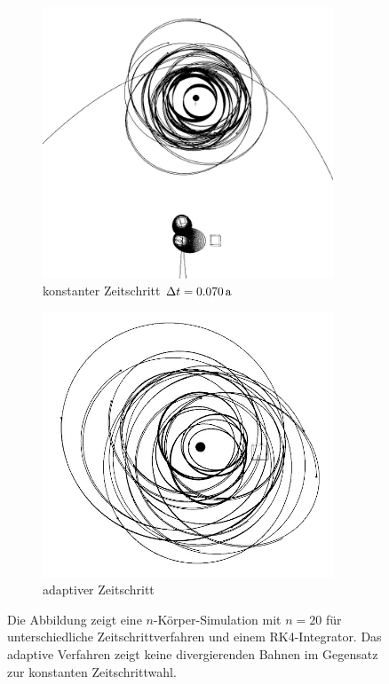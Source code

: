     \begin{figure}[h]
      \begin{subfigure}[b]{0.49\textwidth}
        \center
        \includegraphics[width=0.95\textwidth]{pictures/adaptive/shit.jpg}
        \caption{konstanter Zeitschritt $\Delta t = 0.070\,\mathrm{a}$}
        \label{subfig:20-koerper-konst}
      \end{subfigure}
      \begin{subfigure}[b]{0.49\textwidth}
        \center
        \includegraphics[width=0.95\textwidth]{pictures/adaptive/good.jpg}
        \caption{adaptiver Zeitschritt}
        \label{subfig:20-koerper-adap}
      \end{subfigure}
      \caption{Die Abbildung zeigt eine $n$-Körper-Simulation mit $n=20$ für unterschiedliche Zeitschrittverfahren und einem RK4-Integrator. Das adaptive Verfahren zeigt keine divergierenden Bahnen im Gegensatz zur konstanten Zeitschrittwahl.}
      \label{fig:20-koerper}
    \end{figure}

